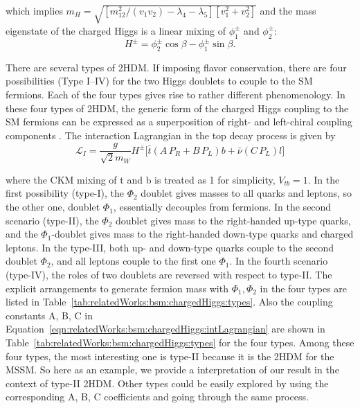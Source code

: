 \noindent which implies $m_{H} = \sqrt{ [m_{12}^2 /(v_1 v_2) - \lambda_4 - \lambda_5] [v_1^2+v_2^2]} $ and the mass eigenstate of the charged Higgs is a linear mixing of $\phi^\pm_1$ and $\phi^\pm_2$:
\begin{equation}
H^\pm = \phi_2^\pm \cos \beta - \phi_1^\pm \sin \beta .
\end{equation}


There are several types of 2HDM. If imposing flavor conservation, there are four possibilities (Type I–IV) for the two Higgs doublets to couple to the SM fermions. Each of the four types gives rise to rather different phenomenology. In these four types of 2HDM, the generic form of the charged Higgs coupling to the SM fermions can be expressed as a superposition of right- and left-chiral coupling components \cite{PhysRevD.41.3421}. The interaction Lagrangian in the top decay process is given by
\begin{equation}
	\mathcal{L}_{I} =  \frac{g}{\sqrt{2} m_W} H^\pm \bigg[  \bar{t} (A \, P_R + B \, P_L) b + \bar{\nu}  (C\, P_L)  l \bigg]
    \label{eqn:relatedWorks:bsm:chargedHiggs:intLagrangian}
\end{equation}

\noindent where the CKM mixing of t and b is treated as 1 for simplicity, $V_{tb}=1$. In the first possibility (type-I), the $\Phi_2$ doublet gives masses to all quarks and leptons, so the other one, doublet $\Phi_1$, essentially decouples from fermions. In the second scenario (type-II), the $\Phi_2$ doublet gives mass to the right-handed up-type quarks, and the $\Phi_1$-doublet gives mass to the right-handed down-type quarks and charged leptons. In the type-III, both up- and down-type quarks couple to the second doublet $\Phi_2$, and all leptons couple to the first one $\Phi_1$. In the fourth scenario (type-IV), the roles of two doublets are reversed with respect to type-II. The explicit arrangements to generate fermion mass with $\Phi_1,\Phi_2$ in the four types are listed in Table~\ref{tab:relatedWorks:bsm:chargedHiggs:types}. Also the coupling constants A, B, C in Equation~\ref{eqn:relatedWorks:bsm:chargedHiggs:intLagrangian} are shown in  Table~\ref{tab:relatedWorks:bsm:chargedHiggs:types} for the four types. Among these four types, the most interesting one is type-II because it is the 2HDM for the MSSM. So here as an example, we provide a interpretation of our result in the context of type-II 2HDM. Other types could be easily explored by using the corresponding A, B, C coefficients and going through the same process.

